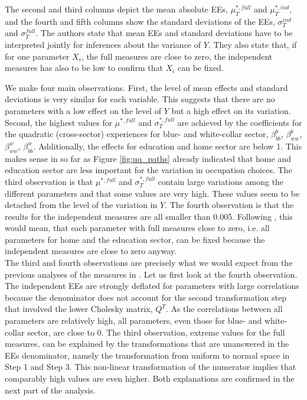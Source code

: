 \documentclass[a4paper,12pt]{article}
\begin{document}
\noindent
The second and third columns depict the mean absolute EEs, $\mu^{*,full}_T$ and $\mu^{*,ind}_T$, and the fourth and fifth columns show the standard deviations of the EEs, $\sigma^{ind}_T$ and $\sigma^{full}_T$. The authors state that mean EEs and standard deviations have to be interpreted jointly for inferences about the variance of $Y$. They also state that, if for one parameter $X_i$, the full measures are close to zero, the independent measures has also to be low to confirm that $X_i$ can be fixed.

We make four main observations. First, the level of mean effects and standard deviations is very similar for each variable. This suggests that there are no parameters with a low effect on the level  of $Y$ but a high effect on its variation. Second, the highest values for $\mu^{*,full}$ and $\sigma^{*,full}_T$ are achieved by the coefficients for the quadratic (cross-sector) experiences for blue- and white-collar sector, $\beta^b_{bb}$, $\beta^b_{ww}$, $\beta^w_{ww}$, $\beta^w_{bb}$. Additionally, the effects for education and home sector are below 1. This makes sense in so far as Figure \ref{fig:uq_paths} already indicated that home and education sector are less important for the variation in occupation choices. The third observation is that $\mu^{*,full}$ and $\sigma^{*,full}_T$ contain large variations among the different parameters and that some values are very high. These values seem to be detached from the level of the variation in $Y$. The fourth observation is that the results for the independent measures are all smaller than 0.005. Following \cite{ge2014efficient}, this would mean, that each parameter with full measures close to zero, i.e. all parameters for home and the education sector, can be fixed because the independent measures are close to zero anyway.\\

\noindent
The third and fourth observations are precisely what we would expect from the previous analyses of the measures in \cite{ge2017extending}. Let us first look at the fourth observation. The independent EEs are strongly deflated for parameters with large correlations because the denominator does not account for the second transformation step that involved the lower Cholesky matrix, $Q^T$. As the correlations between all parameters are relatively high, all parameters, even those for blue- and white-collar sector, are close to 0. The third observation, extreme values for the full measures, can be explained by the transformations that are unanswered in the EEs denominator, namely the transformation from uniform to normal space in Step 1 and Step 3. This non-linear transformation of the numerator implies that comparably high values are even higher. Both explanations are confirmed in the next part of the analysis.\\
\end{document}
